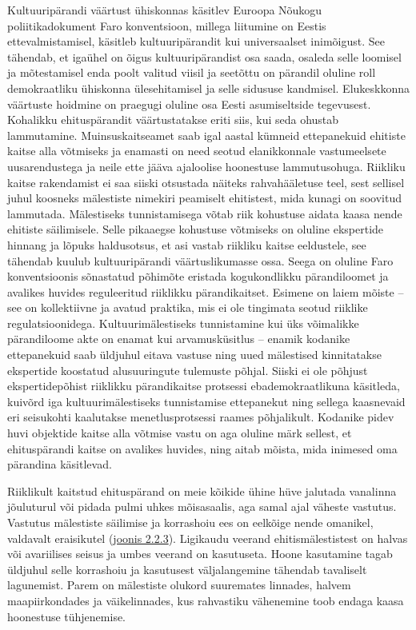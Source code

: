 \documentclass[estonian,]{article}
\begin{document}
Kultuuripärandi väärtust ühiskonnas käsitlev Euroopa Nõukogu poliitikadokument Faro konventsioon, millega liitumine on Eestis ettevalmistamisel, käsitleb kultuuripärandit kui universaalset inimõigust. See tähendab, et igaühel on õigus kultuuripärandist osa saada, osaleda selle loomisel ja mõtestamisel enda poolt valitud viisil ja seetõttu on pärandil oluline roll demokraatliku ühiskonna ülesehitamisel ja selle sidususe kandmisel. Elukeskkonna väärtuste hoidmine on praegugi oluline osa Eesti asumiseltside tegevusest. Kohalikku ehituspärandit väärtustatakse eriti siis, kui seda ohustab lammutamine. Muinsuskaitseamet saab igal aastal kümneid ettepanekuid ehitiste kaitse alla võtmiseks ja enamasti on need seotud elanikkonnale vastumeelsete uusarendustega ja neile ette jääva ajaloolise hoonestuse lammutusohuga. Riikliku kaitse rakendamist ei saa siiski otsustada näiteks rahvahääletuse teel, sest sellisel juhul koosneks mälestiste nimekiri peamiselt ehitistest, mida kunagi on soovitud lammutada. Mälestiseks tunnistamisega võtab riik kohustuse aidata kaasa nende ehitiste säilimisele. Selle pikaaegse kohustuse võtmiseks on oluline ekspertide hinnang ja lõpuks haldusotsus, et asi vastab riikliku kaitse eeldustele, see tähendab kuulub kultuuripärandi väärtuslikumasse ossa. Seega on oluline Faro konventsioonis sõnastatud põhimõte eristada kogukondlikku pärandiloomet ja avalikes huvides reguleeritud riiklikku pärandikaitset. Esimene on laiem mõiste -- see on kollektiivne ja avatud praktika, mis ei ole tingimata seotud riiklike regulatsioonidega. Kultuurimälestiseks tunnistamine kui üks võimalikke pärandiloome akte on enamat kui arvamusküsitlus -- enamik kodanike ettepanekuid saab üldjuhul eitava vastuse ning uued mälestised kinnitatakse ekspertide koostatud alusuuringute tulemuste põhjal. Siiski ei ole põhjust ekspertidepõhist riiklikku pärandikaitse protsessi ebademokraatlikuna käsitleda, kuivõrd iga kultuurimälestiseks tunnistamise ettepanekut ning sellega kaasnevaid eri seisukohti kaalutakse menetlusprotsessi raames põhjalikult. Kodanike pidev huvi objektide kaitse alla võtmise vastu on aga oluline märk sellest, et ehituspärandi kaitse on avalikes huvides, ning aitab mõista, mida inimesed oma pärandina käsitlevad.

Riiklikult kaitstud ehituspärand on meie kõikide ühine hüve jalutada vanalinna jõuluturul või pidada pulmi uhkes mõisasaalis, aga samal ajal väheste vastutus. Vastutus mälestiste säilimise ja korrashoiu ees on eelkõige nende omanikel, valdavalt eraisikutel (\protect\hyperlink{figure223}{joonis 2.2.3}). Ligikaudu veerand ehitismälestistest on halvas või avariilises seisus ja umbes veerand on kasutuseta. Hoone kasutamine tagab üldjuhul selle korrashoiu ja kasutusest väljalangemine tähendab tavaliselt lagunemist. Parem on mälestiste olukord suuremates linnades, halvem maapiirkondades ja väikelinnades, kus rahvastiku vähenemine toob endaga kaasa hoonestuse tühjenemise.
\end{document}
